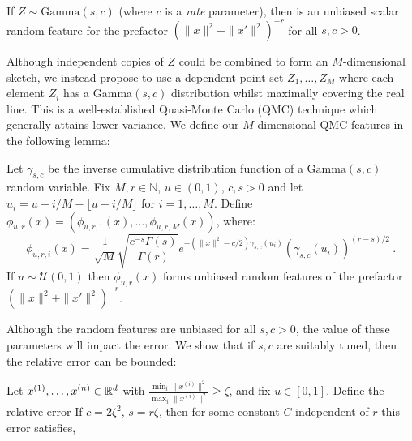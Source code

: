 \begin{lemma}\label{scalar prefactor features lemma}
    If  $Z\sim\mathrm{Gamma}(s,c)$ (where $c$ is a \emph{rate} parameter), then
     is an unbiased scalar random feature for the prefactor $(\|x\|^2 + \|x'\|^2)^{-r}$
    for all $s,c>0$.
\end{lemma}
Although independent copies of $Z$ could be combined to form an $M$-dimensional sketch,
we instead propose to use a dependent point set $Z_1,\dots,Z_M$ where each element $Z_i$ has a Gamma$(s,c)$ distribution whilst maximally covering the real line. This is a well-established Quasi-Monte Carlo (QMC) technique which generally attains
lower variance. 
We define our $M$-dimensional QMC features in the following lemma:
\begin{lemma}\label{lemma:def QMC prefactor features}
     Let $\gamma_{s,c}$ be the inverse cumulative distribution function of a $\mathrm{Gamma}(s,c)$ random variable.
     Fix $M,r\in\mathbb{N}$, $u\in(0,1)$, $c,s>0$ and let $u_i = u + i/M - \lfloor u + i/M\rfloor$ for $i=1,\dots,M$.
     Define $\phi_{u,r}(x) = (\phi_{u,r,1}(x),\dots,\phi_{u,r,M}(x))$, where:
     \begin{equation}
         \phi_{u,r,i}(x) =\frac{1}{\sqrt M}\sqrt{\frac{c^{-s}\Gamma(s)}{\Gamma(r)} } e^{-(\|x\|^2-c/2)\gamma_{s,c}(u_i) }(\gamma_{s,c}(u_i))^{(r-s)/2}\ .
     \end{equation}
     If $u\sim\mathcal U(0,1)$ then $\phi_{u,r}(x)$ forms unbiased random features of the prefactor $(\|x\|^2 + \|x'\|^2)^{-r}$.
\end{lemma}
Although the random features are unbiased for all $s,c>0$, the value of these parameters will impact the error.
We show that if $s,c$ are suitably tuned, then the relative error can be bounded:
 \begin{lemma} \label{QMC error}
Let $x^{(1)},\dots,x^{(n)}\in \mathbb{R}^d$ with $\frac{\min_i \|x^{(i)}\|^2}{\max_i \|x^{(i)}\|^2} \ge \zeta$, and fix $u\in[0,1]$. Define the relative error
If $c = 2\zeta^2$, $s=r\zeta$, then 
for some constant $C$ independent of $r$
this error satisfies, 
\end{lemma}

